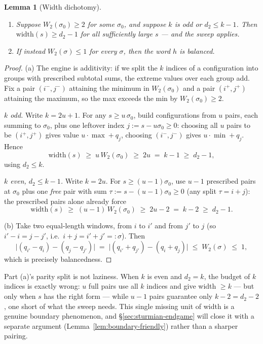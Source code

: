 \documentclass[11pt,reqno]{amsart}
\theoremstyle{plain}
\newtheorem{lemma}[theorem]{Lemma}
\theoremstyle{definition}
\theoremstyle{remark}
\begin{document}
\begin{lemma}[Width dichotomy]\label{lem:width-friendly}
\phantom{.}
\begin{enumerate}
\item[\textup{(a)}] Suppose $W_2(\sigma_0) \ge 2$ for some $\sigma_0$, and suppose
      $k$ is odd or $d_2 \le k - 1$. Then $\mathrm{width}(s) \ge d_2 - 1$ for all
      sufficiently large $s$ --- and the sweep applies.
\item[\textup{(b)}] If instead $W_2(\sigma) \le 1$ for \emph{every} $\sigma$, then
      the word $h$ is balanced.
\end{enumerate}
\end{lemma}

\begin{proof}
(a) The engine is additivity: if we split the $k$ indices of a configuration into
groups with prescribed subtotal sums, the extreme values over each group add. Fix a
pair $(i^-, j^-)$ attaining the minimum in $W_2(\sigma_0)$ and a pair $(i^+, j^+)$
attaining the maximum, so the max exceeds the min by $W_2(\sigma_0) \ge 2$.

\emph{$k$ odd.} Write $k = 2u + 1$. For any $s \ge u\,\sigma_0$, build
configurations from $u$ pairs, each summing to $\sigma_0$, plus one leftover index
$j := s - u\sigma_0 \ge 0$: choosing all $u$ pairs to be $(i^+, j^+)$ gives value
$u \cdot \max + q_j$, choosing $(i^-, j^-)$ gives $u \cdot \min + q_j$. Hence
\[
  \mathrm{width}(s) \;\ge\; u\,W_2(\sigma_0) \;\ge\; 2u \;=\; k - 1 \;\ge\; d_2 - 1 ,
\]
using $d_2 \le k$.

\emph{$k$ even, $d_2 \le k-1$.} Write $k = 2u$. For $s \ge (u-1)\sigma_0$, use
$u - 1$ prescribed pairs at $\sigma_0$ plus one \emph{free} pair with sum
$\tau := s - (u-1)\sigma_0 \ge 0$ (any split $\tau = i + j$): the prescribed pairs
alone already force
\[
  \mathrm{width}(s) \;\ge\; (u-1)\,W_2(\sigma_0) \;\ge\; 2u - 2 \;=\; k - 2 \;\ge\;
  d_2 - 1 .
\]

(b) Take two equal-length windows, from $i$ to $i'$ and from $j'$ to $j$ (so
$i' - i = j - j'$, i.e.\ $i + j = i' + j' =: \sigma$). Then
\[
  \big| (q_{i'} - q_i) - (q_j - q_{j'}) \big|
  \;=\; \big| (q_{i'} + q_{j'}) - (q_i + q_j) \big|
  \;\le\; W_2(\sigma) \;\le\; 1 ,
\]
which is precisely balancedness.
\end{proof}

Part (a)'s parity split is not laziness. When $k$ is even and $d_2 = k$, the
budget of $k$ indices is exactly wrong: $u$ full pairs use all $k$ indices and give
width $\ge k$ --- but only when $s$ has the right form --- while $u - 1$ pairs
guarantee only $k - 2 = d_2 - 2$, one short of what the sweep needs. This single
missing unit of width is a genuine boundary phenomenon, and
\S\ref{sec:sturmian-endgame} will close it with a separate argument
(Lemma~\ref{lem:boundary-friendly}) rather than a sharper pairing.
\end{document}
